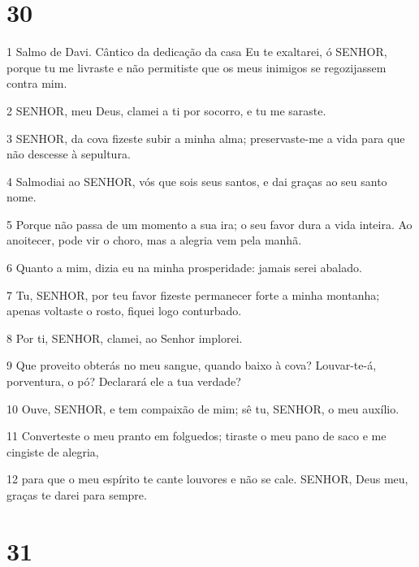 \chapter{30}

\par 1 Salmo de Davi. Cântico da dedicação da casa Eu te exaltarei, ó SENHOR, porque tu me livraste e não permitiste que os meus inimigos se regozijassem contra mim.
\par 2 SENHOR, meu Deus, clamei a ti por socorro, e tu me saraste.
\par 3 SENHOR, da cova fizeste subir a minha alma; preservaste-me a vida para que não descesse à sepultura.
\par 4 Salmodiai ao SENHOR, vós que sois seus santos, e dai graças ao seu santo nome.
\par 5 Porque não passa de um momento a sua ira; o seu favor dura a vida inteira. Ao anoitecer, pode vir o choro, mas a alegria vem pela manhã.
\par 6 Quanto a mim, dizia eu na minha prosperidade: jamais serei abalado.
\par 7 Tu, SENHOR, por teu favor fizeste permanecer forte a minha montanha; apenas voltaste o rosto, fiquei logo conturbado.
\par 8 Por ti, SENHOR, clamei, ao Senhor implorei.
\par 9 Que proveito obterás no meu sangue, quando baixo à cova? Louvar-te-á, porventura, o pó? Declarará ele a tua verdade?
\par 10 Ouve, SENHOR, e tem compaixão de mim; sê tu, SENHOR, o meu auxílio.
\par 11 Converteste o meu pranto em folguedos; tiraste o meu pano de saco e me cingiste de alegria,
\par 12 para que o meu espírito te cante louvores e não se cale. SENHOR, Deus meu, graças te darei para sempre.

\chapter{31}

